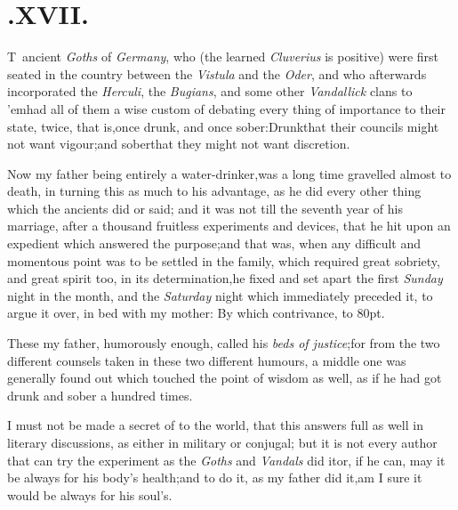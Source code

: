 \documentclass{article}
\begin{document}
\smallskip

\section{.\enspace XVII.}

\lettrine{T}{\,} ancient \textit{Goths} of
\textit{Germany}, who (the learned \textit{Cluverius} is positive) were
first seated in the country between the \textit{Vistula} and the
\textit{Oder}, and who afterwards incorporated the \textit{Herculi}, the
\textit{Bugians}, and some other \textit{Vandallick} clans to
’em\tsk had all of them a wise custom of debating every
thing of importance to their state, twice, that is,\tsk once
drunk, and once sober:\tsh Drunk\tsk that their councils
might not want vigour;\tsh and sober\tsk that they might
not want discretion.

Now my father being entirely a water-drinker,\tsk was a long
time gravelled almost to death, in turning this as much to his
advantage, as he did every other thing which the ancients did or
said; and it was not till the seventh year of his marriage, after a
thousand fruitless experiments and devices, that he hit upon an
expedient which answered the purpose;\tsh and that was,
when any difficult and momentous point was to be settled in the
family, which required great sobriety, and great spirit too, in its
determination,\tsh he fixed and set apart the first
\textit{Sunday} night in the month, and
the \textit{Saturday} night which immediately
preceded it, to argue it over, in bed\break
with my mother: By which contrivance,\break
{}
\stick{\astfill}
\stick{\astfill}
\stick{\astfill}
\hbox to 80pt{\astfill}.

These my father, humorously enough, called his \textit{beds of
justice};\tsh for from the two different counsels taken
in these two different humours, a middle one was generally found
out which touched the point of wisdom as well, as if he had got
drunk and sober a hundred times.

I must not be made a secret of to the world, that this answers
full as well in literary discussions, as either in military or
conjugal; but it is not every author that can try the experiment as
the \textit{Goths} and \textit{Vandals} did it\tsh or, if he
can, may it be always for his body’s health;\break and to do it, as
my father did it,\tsk\break am I sure it would be always for his
soul’s.
\end{document}
